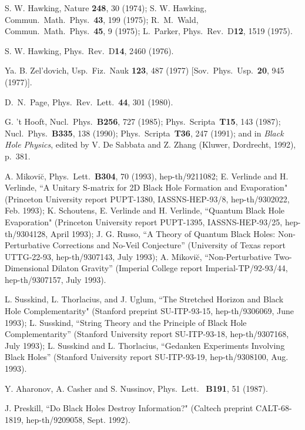 \documentclass[12pt]{article}
\begin{document}
\newpage
	\begin{thebibliography}{99}
\baselineskip 15.1pt
\parskip 0pt
 S. W. Hawking, Nature {\bf 248}, 30 (1974);
S. W. Hawking, Commun.\ Math.\ Phys.\ {\bf 43}, 199 (1975);
R.\ M.\ Wald, Commun.\ Math.\ Phys.\ {\bf 45}, 9 (1975);
L.\ Parker, Phys.\ Rev.\ D{\bf12}, 1519 (1975).

 S. W. Hawking,  Phys.\ Rev.\ D{\bf14}, 2460 (1976).

 Ya. B. Zel'dovich, Usp.\ Fiz.\ Nauk {\bf 123}, 487
(1977)
[Sov.\ Phys.\ Usp.\ {\bf 20}, 945 (1977)].

 D.\ N.\ Page, Phys.\ Rev.\ Lett.\ {\bf 44}, 301
(1980).

 G. 't Hooft, Nucl.\ Phys.\ {\bf B256}, 727 (1985);
Phys.\ Scripta\ {\bf T15}, 143 (1987);
Nucl.\ Phys.\ {\bf B335}, 138 (1990);
Phys.\ Scripta\ {\bf T36}, 247 (1991);
and in {\em Black Hole Physics}, edited by V. De
Sabbata and Z. Zhang (Kluwer, Dordrecht, 1992), p.~381.

 A. Mikovi\u{c}, Phys.\ Lett.\ {\bf B304}, 70
(1993),
hep-th/9211082;
E. Verlinde and H. Verlinde, ``A Unitary S-matrix for 2D Black
Hole Formation and Evaporation" (Princeton University report
PUPT-1380,
IASSNS-HEP-93/8, hep-th/9302022, Feb. 1993);
K. Schoutens, E. Verlinde and H. Verlinde, ``Quantum Black Hole
Evaporation" (Princeton University report PUPT-1395,
IASSNS-HEP-93/25,
hep-th/9304128, April 1993);
J. G. Russo, ``A Theory of Quantum Black Holes:
Non-Perturbative Corrections and No-Veil Conjecture''
(University of Texas report UTTG-22-93, hep-th/9307143, July 1993);
A. Mikovi\u{c}, ``Non-Perturbative Two-Dimensional Dilaton
Gravity'' (Imperial College report Imperial-TP/92-93/44,
hep-th/9307157, July 1993).

 L. Susskind, L. Thorlacius, and J. Uglum, ``The
Stretched
Horizon and Black Hole Complementarity" (Stanford preprint
SU-ITP-93-15, hep-th/9306069, June 1993);
L. Susskind, ``String Theory and the Principle of Black Hole
Complementarity'' (Stanford University report SU-ITP-93-18,
hep-th/9307168, July 1993);
L. Susskind and L. Thorlacius, ``Gedanken Experiments
Involving Black Holes'' (Stanford University report SU-ITP-93-19,
hep-th/9308100, Aug. 1993).

 Y. Aharonov, A. Casher and S. Nussinov,  Phys.\ Lett.\
{\bf
B191}, 51 (1987).

 J. Preskill, ``Do Black Holes Destroy Information?"
(Caltech
preprint CALT-68-1819, hep-th/9209058, Sept. 1992).


\end{thebibliography}
\end{document}
